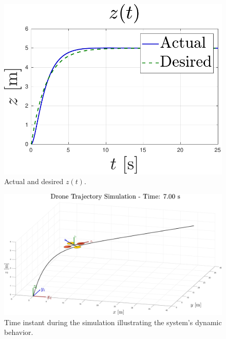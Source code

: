 \begin{figure}
\begin{minipage}[b]{0.45\textwidth}
        \label{fig:pid_y}
    \end{minipage}
    \begin{minipage}[b]{0.48\textwidth}
        \vspace{0.4cm}
        \centering
        \includegraphics[width=\textwidth]{images/pid_z.pdf}
        \caption[Tracking in Z-axis]{Actual and desired $z(t)$.}
        \label{fig:pid_z}
    \end{minipage}
\end{figure}

\begin{figure}
    \centering
    \includegraphics[width=\textwidth]{images/pid_sim.pdf}
    \caption[Simulation Overview]{Time instant during the simulation illustrating the system's dynamic behavior.}
    \label{fig:pid_sim}
\end{figure}

